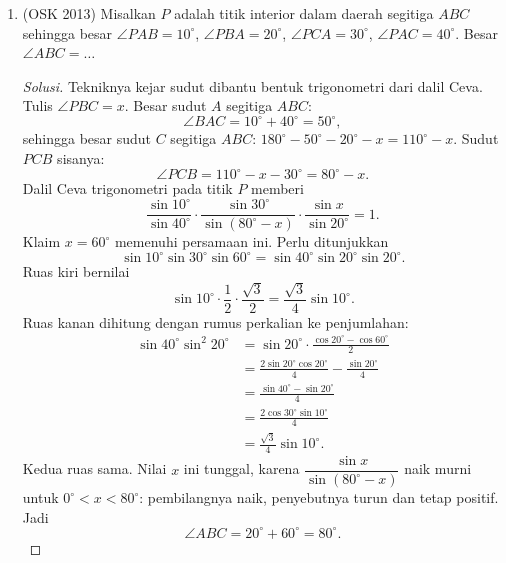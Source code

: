 \documentclass[12pt]{scrartcl}
\begin{document}
\begin{enumerate}
	\item (OSK 2013)
	Misalkan $P$ adalah titik interior dalam daerah segitiga $ABC$
	sehingga besar $\angle PAB=10^{\circ}$, $\angle PBA=20^{\circ}$,
	$\angle PCA=30^{\circ}$, $\angle PAC=40^{\circ}$. Besar
	$\angle ABC=\dots$
\begin{center}
\end{center}
	\begin{proof}[Solusi]
	Tekniknya kejar sudut dibantu bentuk trigonometri dari dalil Ceva.
	Tulis $\angle PBC = x$. Besar sudut $A$ segitiga $ABC$:
	\[ \angle BAC = 10^\circ + 40^\circ = 50^\circ, \]
	sehingga besar sudut $C$ segitiga $ABC$:
	$180^\circ - 50^\circ - 20^\circ - x = 110^\circ - x$.
	Sudut $PCB$ sisanya:
	\[ \angle PCB = 110^\circ - x - 30^\circ = 80^\circ - x. \]
	Dalil Ceva trigonometri pada titik $P$ memberi
	\[ \frac{\sin 10^\circ}{\sin 40^\circ} \cdot
	\frac{\sin 30^\circ}{\sin(80^\circ - x)} \cdot
	\frac{\sin x}{\sin 20^\circ} = 1. \]
	Klaim $x = 60^\circ$ memenuhi persamaan ini. Perlu ditunjukkan
	\[ \sin 10^\circ \sin 30^\circ \sin 60^\circ
	= \sin 40^\circ \sin 20^\circ \sin 20^\circ. \]
	Ruas kiri bernilai
	\[ \sin 10^\circ \cdot \frac12 \cdot \frac{\sqrt3}{2}
	= \frac{\sqrt3}{4}\sin 10^\circ. \]
	Ruas kanan dihitung dengan rumus perkalian ke penjumlahan:
	\begin{align*}
	\sin 40^\circ \sin^2 20^\circ
	&= \sin 20^\circ \cdot \frac{\cos 20^\circ - \cos 60^\circ}{2} \\
	&= \frac{2\sin 20^\circ\cos 20^\circ}{4}
	- \frac{\sin 20^\circ}{4} \\
	&= \frac{\sin 40^\circ - \sin 20^\circ}{4} \\
	&= \frac{2\cos 30^\circ\sin 10^\circ}{4} \\
	&= \frac{\sqrt3}{4}\sin 10^\circ.
	\end{align*}
	Kedua ruas sama. Nilai $x$ ini tunggal, karena
	$\dfrac{\sin x}{\sin(80^\circ - x)}$ naik murni untuk
	$0^\circ < x < 80^\circ$: pembilangnya naik, penyebutnya turun
	dan tetap positif. Jadi
	\[ \angle ABC = 20^\circ + 60^\circ = 80^\circ. \]
	\end{proof}

\end{enumerate}
\end{document}
